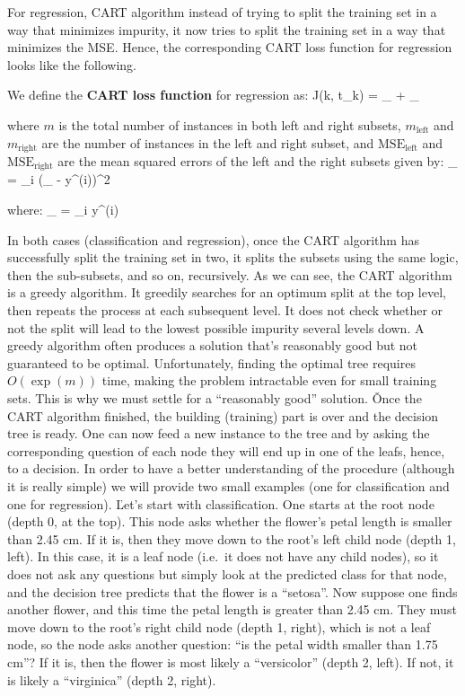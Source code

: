 For regression, CART algorithm instead of trying to split the training set in a way that minimizes impurity, it now
tries to split the training set in a way that minimizes the MSE. Hence, the corresponding CART loss function for
regression looks like the following.

We define the \textbf{CART loss function} for regression as:
\bse
J(k, t_{k}) =  _{}
+ _{}
\ese

where $m$ is the total number of instances in both left and right subsets, $m_{\text{left}}$ and
$m_{\text{right}}$ are the number of instances in the left and right subset, and $\text{MSE}_{\text{left}}$ and
$\text{MSE}_{\text{right}}$ are the mean squared errors of the left and the right subsets given by:
\bse
{}_{} = \sum_{i \in {}} ({}_ - y^{(i)})^2
\ese

where:
\bse
{}_ =  \sum_{i \in {}} y^{(i)}
\ese
\ed

In both cases (classification and regression), once the CART algorithm has successfully split the training set in
two, it splits the subsets using the same logic, then the sub-subsets, and so on, recursively. As we can see, the
CART algorithm is a greedy algorithm. It greedily searches for an optimum split at the top level, then repeats the
process at each subsequent level. It does not check whether or not the split will lead to the lowest possible
impurity several levels down. A greedy algorithm often produces a solution that's reasonably good but not guaranteed
to be optimal. Unfortunately, finding the optimal tree requires $O(\exp(m)) $ time, making the problem intractable
even for small training sets. This is why we must settle for a ``reasonably good'' solution. \v

Once the CART algorithm finished, the building (training) part is over and the decision tree is ready. One can now
feed a new instance to the tree and by asking the corresponding question of each node they will end up in one of the
leafs, hence, to a decision. In order to have a better understanding of the procedure (although it is really simple)
we will provide two small examples (one for classification and one for regression). \v

Let's start with classification. One starts at the root node (depth 0, at the top). This node asks whether the
flower's petal length is smaller than 2.45 cm. If it is, then they move down to the root's left child node (depth 1,
left). In this case, it is a leaf node (i.e.\ it does not have any child nodes), so it does not ask any questions but
simply look at the predicted class for that node, and the decision tree predicts that the flower is a ``setosa''. Now
suppose one finds another flower, and this time the petal length is greater than 2.45 cm. They must move down to the
root's right child node (depth 1, right), which is not a leaf node, so the node asks another question: ``is the petal
width smaller than 1.75 cm''? If it is, then the flower is most likely a ``versicolor'' (depth 2, left). If not, it is
likely a ``virginica'' (depth 2, right).

